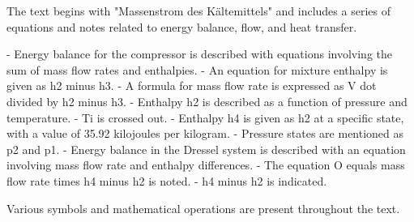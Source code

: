 The text begins with "Massenstrom des Kältemittels" and includes a series of equations and notes related to energy balance, flow, and heat transfer. 

- Energy balance for the compressor is described with equations involving the sum of mass flow rates and enthalpies.
- An equation for mixture enthalpy is given as h2 minus h3.
- A formula for mass flow rate is expressed as V dot divided by h2 minus h3.
- Enthalpy h2 is described as a function of pressure and temperature.
- Ti is crossed out.
- Enthalpy h4 is given as h2 at a specific state, with a value of 35.92 kilojoules per kilogram.
- Pressure states are mentioned as p2 and p1.
- Energy balance in the Dressel system is described with an equation involving mass flow rate and enthalpy differences.
- The equation O equals mass flow rate times h4 minus h2 is noted.
- h4 minus h2 is indicated.

Various symbols and mathematical operations are present throughout the text.